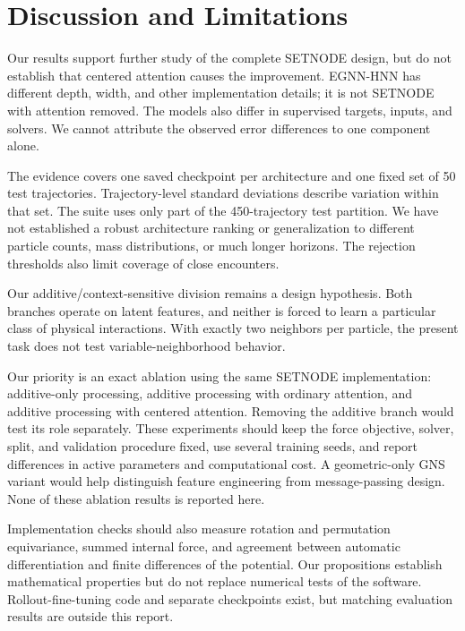 \documentclass[10pt,letterpaper,twocolumn]{article}
\numberwithin{equation}{section}
\begin{document}
\section{Discussion and Limitations}
\label{sec:discussion}

Our results support further study of the complete SETNODE design, but do not establish that
centered attention causes the improvement. EGNN-HNN has different depth, width, and other
implementation details; it is not SETNODE with attention removed. The models also differ in
supervised targets, inputs, and solvers. We cannot attribute the observed error differences to one
component alone.

The evidence covers one saved checkpoint per architecture and one fixed set of 50 test trajectories.
Trajectory-level standard deviations describe variation within that set. 
The suite uses only part of the 450-trajectory test partition. We have not established
a robust architecture ranking or generalization to different particle counts, mass distributions,
or much longer horizons. The rejection thresholds also limit coverage of close encounters.

Our additive/context-sensitive division remains a design hypothesis. Both branches operate on
latent features, and neither is forced to learn a particular class of physical interactions. With
exactly two neighbors per particle, the present task does not test variable-neighborhood behavior.

Our priority is an exact ablation using the same SETNODE implementation: additive-only processing,
additive processing with ordinary attention, and additive processing with centered attention.
Removing the additive branch would test its role separately. These experiments should keep the
force objective, solver, split, and validation procedure fixed, use several training seeds, and
report differences in active parameters and computational cost. A geometric-only GNS variant
would help distinguish feature engineering from message-passing design. None of these ablation
results is reported here.

Implementation checks should also measure rotation and permutation equivariance, summed internal
force, and agreement between automatic differentiation and finite differences of the potential.
Our propositions establish mathematical properties but do not replace numerical tests of the
software. Rollout-fine-tuning code and separate checkpoints exist, but matching evaluation results
are outside this report.
\end{document}
